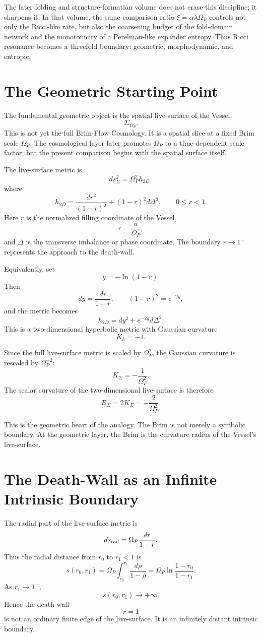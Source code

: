 \documentclass[11pt]{article}
\newcommand{\SigmaP}{\Sigma_{\Omega_P}}
\begin{document}
The later folding and structure-formation volume does not erase this discipline; it sharpens it. In that volume, the same comparison ratio \(\xi=\alpha\lambda\Omega_P\) controls not only the Ricci-like rate, but also the coarsening budget of the fold-domain network and the monotonicity of a Perelman-like expander entropy. Thus Ricci resonance becomes a threefold boundary: geometric, morphodynamic, and entropic.

\section{The Geometric Starting Point}

The fundamental geometric object is the spatial live-surface of the Vessel,
\[
\SigmaP.
\]
This is not yet the full Brim-Flow Cosmology. It is a spatial slice at a fixed Brim scale \(\Omega_P\). The cosmological layer later promotes \(\Omega_P\) to a time-dependent scale factor, but the present comparison begins with the spatial surface itself.

The live-surface metric is
\[
 ds^2_{\Sigma}
 =
 \Omega_P^2 h_{2D},
\]
where
\[
 h_{2D}
 =
 \frac{dr^2}{(1-r)^2}
 +(1-r)^2d\Delta^2,
 \qquad 0\le r<1.
\]
Here \(r\) is the normalized filling coordinate of the Vessel,
\[
 r=\frac{u}{\Omega_P},
\]
and \(\Delta\) is the transverse imbalance or phase coordinate. The boundary \(r\to1^-\) represents the approach to the death-wall.

Equivalently, set
\[
 y=-\ln(1-r).
\]
Then
\[
 dy=\frac{dr}{1-r},
 \qquad
 (1-r)^2=e^{-2y},
\]
and the metric becomes
\[
 h_{2D}=dy^2+e^{-2y}d\Delta^2.
\]
This is a two-dimensional hyperbolic metric with Gaussian curvature
\[
 K_h=-1.
\]

Since the full live-surface metric is scaled by \(\Omega_P^2\), the Gaussian curvature is rescaled by \(\Omega_P^{-2}\):
\[
 K_{\Sigma}=-\frac{1}{\Omega_P^2}.
\]
The scalar curvature of the two-dimensional live-surface is therefore
\[
 R_{\Sigma}=2K_{\Sigma}=-\frac{2}{\Omega_P^2}.
\]

This is the geometric heart of the analogy. The Brim is not merely a symbolic boundary. At the geometric layer, the Brim is the curvature radius of the Vessel's live-surface.

\section{The Death-Wall as an Infinite Intrinsic Boundary}

The radial part of the live-surface metric is
\[
 ds_{\rm rad}=\Omega_P\frac{dr}{1-r}.
\]
Thus the radial distance from \(r_0\) to \(r_1<1\) is
\[
 s(r_0,r_1)
 =
 \Omega_P\int_{r_0}^{r_1}\frac{d\rho}{1-\rho}
 =
 \Omega_P\ln\frac{1-r_0}{1-r_1}.
\]
As \(r_1\to1^-\),
\[
 s(r_0,r_1)\to+\infty.
\]
Hence the death-wall
\[
 r=1
\]
is not an ordinary finite edge of the live-surface. It is an infinitely distant intrinsic boundary.
\end{document}
